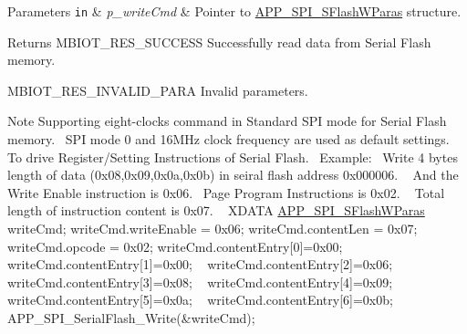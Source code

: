\begin{DoxyParams}[1]{Parameters}
\mbox{\tt in}  & {\em p\+\_\+write\+Cmd} & Pointer to \hyperlink{struct_a_p_p___s_p_i___s_flash_w_paras}{A\+P\+P\+\_\+\+S\+P\+I\+\_\+\+S\+Flash\+W\+Paras} structure.\\
\hline
\end{DoxyParams}
\begin{DoxyReturn}{Returns}
M\+B\+I\+O\+T\+\_\+\+R\+E\+S\+\_\+\+S\+U\+C\+C\+E\+SS Successfully read data from Serial Flash memory. 

M\+B\+I\+O\+T\+\_\+\+R\+E\+S\+\_\+\+I\+N\+V\+A\+L\+I\+D\+\_\+\+P\+A\+RA Invalid parameters.
\end{DoxyReturn}
\begin{DoxyNote}{Note}
Supporting eight-\/clocks command in Standard S\+PI mode for Serial Flash memory.~\newline
 S\+PI mode 0 and 16\+M\+Hz clock frequency are used as default settings. ~\newline
 To drive Register/\+Setting Instructions of Serial Flash.~\newline
 Example\+:~\newline
 Write 4 bytes length of data (0x08,0x09,0x0a,0x0b) in seiral flash address 0x000006. ~\newline
 And the Write Enable instruction is 0x06.~\newline
 Page Program Instructions is 0x02. ~\newline
 Total length of instruction content is 0x07. ~\newline
 X\+D\+A\+TA \hyperlink{struct_a_p_p___s_p_i___s_flash_w_paras}{A\+P\+P\+\_\+\+S\+P\+I\+\_\+\+S\+Flash\+W\+Paras} write\+Cmd; write\+Cmd.\+write\+Enable = 0x06; write\+Cmd.\+content\+Len = 0x07; write\+Cmd.\+opcode = 0x02; write\+Cmd.\+content\+Entry\mbox{[}0\mbox{]}=0x00; ~\newline
 write\+Cmd.\+content\+Entry\mbox{[}1\mbox{]}=0x00; ~\newline
 write\+Cmd.\+content\+Entry\mbox{[}2\mbox{]}=0x06; ~\newline
 write\+Cmd.\+content\+Entry\mbox{[}3\mbox{]}=0x08; ~\newline
 write\+Cmd.\+content\+Entry\mbox{[}4\mbox{]}=0x09; ~\newline
 write\+Cmd.\+content\+Entry\mbox{[}5\mbox{]}=0x0a; ~\newline
 write\+Cmd.\+content\+Entry\mbox{[}6\mbox{]}=0x0b; ~\newline
 A\+P\+P\+\_\+\+S\+P\+I\+\_\+\+Serial\+Flash\+\_\+\+Write(\&write\+Cmd); 
\end{DoxyNote}

